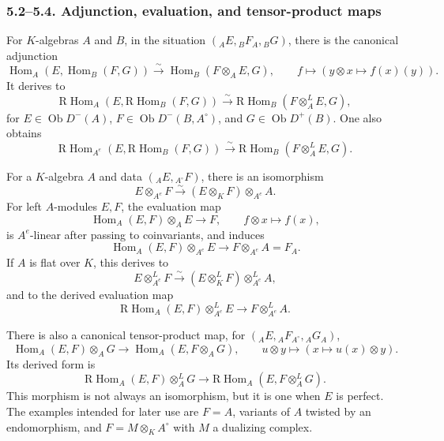 \documentclass[12pt]{article}
\newcommand{\Hom}{\operatorname{Hom}}
\newcommand{\ob}{\operatorname{Ob}}
\newcommand{\R}{\mathrm R}
\begin{document}
\subsubsection*{5.2--5.4. Adjunction, evaluation, and tensor-product maps}
For $K$-algebras $A$ and $B$, in the situation $({}_AE,{}_BF_A,{}_BG)$, there is the canonical adjunction
\begin{equation}
\Hom_A(E,\Hom_B(F,G))\xrightarrow{\sim}\Hom_B(F\otimes_AE,G),
\qquad f\mapsto (y\otimes x\mapsto f(x)(y)).                    \tag{5.2.1}
\end{equation}
It derives to
\begin{equation}
\R\Hom_A(E,\R\Hom_B(F,G))\xrightarrow{\sim}
\R\Hom_B(F\otimes_A^LE,G),                                      \tag{5.2.2}
\end{equation}
for $E\in\ob D^-(A)$, $F\in\ob D^-(B,A^{\circ})$, and $G\in\ob D^+(B)$. One also obtains
\begin{equation}
\R\Hom_{A^e}(E,\R\Hom_B(F,G))\xrightarrow{\sim}
\R\Hom_B(F\otimes_A^LE,G).                                      \tag{5.2.3}
\end{equation}

For a $K$-algebra $A$ and data $({}_AE,{}_{A^{\circ}}F)$, there is an isomorphism
\begin{equation}
   E\otimes_{A^e}F\xrightarrow{\sim}(E\otimes_KF)\otimes_{A^e}A.
   \tag{5.3.1}
\end{equation}
For left $A$-modules $E,F$, the evaluation map
\begin{equation}
   \Hom_A(E,F)\otimes_AE\to F,
   \qquad f\otimes x\mapsto f(x),                               \tag{5.3.2}
\end{equation}
is $A^e$-linear after passing to coinvariants, and induces
\begin{equation}
   \Hom_A(E,F)\otimes_{A^e}E\to F\otimes_{A^e}A=F_A.              \tag{5.3.3}
\end{equation}
If $A$ is flat over $K$, this derives to
\begin{equation}
   E\otimes_{A^e}^LF\xrightarrow{\sim}(E\otimes_K^LF)\otimes_{A^e}^LA, \tag{5.3.4}
\end{equation}
and to the derived evaluation map
\begin{equation}
   \R\Hom_A(E,F)\otimes_{A^e}^LE\to F\otimes_{A^e}^LA.             \tag{5.3.5}
\end{equation}

There is also a canonical tensor-product map, for $({}_AE,{}_AF_{A^{\circ}},{}_AG_A)$,
\begin{equation}
   \Hom_A(E,F)\otimes_AG\to \Hom_A(E,F\otimes_AG),
   \qquad u\otimes y\mapsto (x\mapsto u(x)\otimes y).             \tag{5.4.1}
\end{equation}
Its derived form is
\begin{equation}
   \R\Hom_A(E,F)\otimes_A^LG\to \R\Hom_A(E,F\otimes_A^LG).         \tag{5.4.2}
\end{equation}
This morphism is not always an isomorphism, but it is one when $E$ is perfect. The examples intended for later use are $F=A$, variants of $A$ twisted by an endomorphism, and $F=M\otimes_KA^{\circ}$ with $M$ a dualizing complex.
\end{document}
